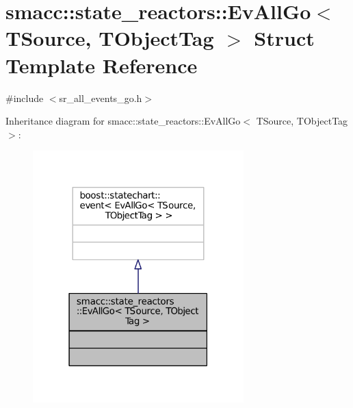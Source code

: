 \hypertarget{structsmacc_1_1state__reactors_1_1EvAllGo}{}\section{smacc\+:\+:state\+\_\+reactors\+:\+:Ev\+All\+Go$<$ T\+Source, T\+Object\+Tag $>$ Struct Template Reference}
\label{structsmacc_1_1state__reactors_1_1EvAllGo}


{\ttfamily \#include $<$sr\+\_\+all\+\_\+events\+\_\+go.\+h$>$}



Inheritance diagram for smacc\+:\+:state\+\_\+reactors\+:\+:Ev\+All\+Go$<$ T\+Source, T\+Object\+Tag $>$\+:
\nopagebreak
\begin{figure}[H]
\begin{center}
\leavevmode
\includegraphics[width=231pt]{structsmacc_1_1state__reactors_1_1EvAllGo__inherit__graph}
\end{center}
\end{figure}


